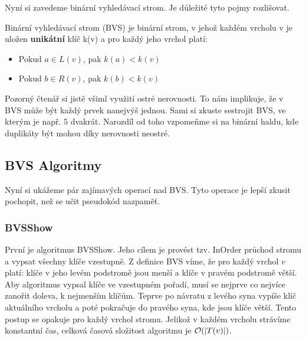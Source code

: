 \noindent Nyní si zavedeme binární vyhledávací strom. Je důležité tyto pojmy rozlišovat.

\begin{definition}
    Binární vyhledávací strom (BVS) je binární strom, v jehož každém vrcholu v je uložen \textbf{unikátní} klíč k(v) a pro každý jeho vrchol platí:

    \begin{itemize}
        \item Pokud $a \in L(v)$, pak $k(a) \bm{<} k(v)$
        \item Pokud $b \in R(v)$, pak $k(b) \bm{<} k(v)$
    \end{itemize}
\end{definition} \bigskip

\begin{remark}
  Pozorný čtenář si jistě všiml využití ostré nerovnosti. To nám implikuje, že v BVS může být každý
  prvek nanejvýš jednou. Sami si zkuste sestrojit BVS, ve kterým je např. $5$ dvakrát. Narozdíl od
  toho vzpomeňme si na binární haldu, kde duplikáty být mohou díky nerovnosti neostré.
\end{remark}

\newpage

\subsection{BVS Algoritmy}

\begin{remark}
Nyní si ukážeme pár zajímavých operací nad BVS. Tyto operace je lepší zkusit pochopit, než se učit
pseudokód nazpaměť.
\end{remark} \bigskip

\subsubsection{BVSShow}

\noindent První je algoritmus BVSShow. Jeho cílem je provést tzv. InOrder průchod stromu a vypsat všechny klíče vzestupně. Z definice BVS víme, že pro každý vrchol $v$ platí: klíče v jeho levém podstromě jsou menší a klíče v pravém podstromě větší. Aby algoritmus vypsal klíče ve vzestupném pořadí, musí se nejprve co nejvíce zanořit doleva, k nejmenším klíčům. Teprve po návratu z levého syna vypíše klíč aktuálního vrcholu a poté pokračuje do pravého syna, kde jsou klíče větší. Tento postup se opakuje pro každý vrchol stromu.
Jelikož v každém vrcholu strávíme konstantní čas, celková časová složitost algoritmu je $\mathcal{O}(|T(v)|)$. \bigskip


